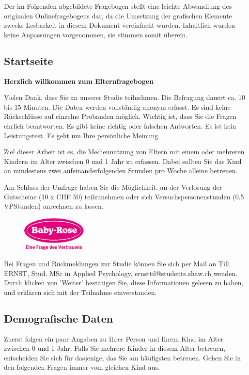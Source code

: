 Der im Folgenden abgebildete Fragebogen stellt eine leichte Abwandlung des originalen Onlinefragebogens dar, da die Umsetzung der grafischen Elemente zwecks Lesbarkeit in diesem Dokument vereinfacht wurden. Inhaltlich wurden keine Anpassungen vorgenommen, sie stimmen somit überein.

\subsection{Startseite}
\textbf{Herzlich willkommen zum Elternfragebogen}

Vielen Dank, dass Sie an unserer Studie teilnehmen. Die Befragung dauert ca. 10 bis 15 Minuten. Die Daten werden vollständig anonym erfasst. Es sind keine Rückschlüsse auf einzelne Probanden möglich. Wichtig ist, dass Sie die Fragen ehrlich beantworten. Es gibt keine richtig oder falschen Antworten. Es ist kein Leistungstest. Es geht um Ihre persönliche Meinung.

Ziel dieser Arbeit ist es, die Mediennutzung von Eltern mit einem oder mehreren Kindern im Alter zwischen 0 und 1 Jahr zu erfassen. Dabei sollten Sie das Kind an mindestens zwei aufeinanderfolgenden Stunden pro Woche alleine betreuen.

Am Schluss der Umfrage haben Sie die Möglichkeit, an der Verlosung der Gutscheine (10 x CHF 50) teilzunehmen oder sich Versuchspersonenstunden (0.5 VPStunden) anrechnen zu lassen.

\begin{figure}[hbtp]
  \centering
     \includegraphics[width=0.3\textwidth]{content/Grafik/babyRose_Logo.jpg}
  \label{fig:babyRose_Logo}
\end{figure}

Bei Fragen und Rückmeldungen zur Studie können Sie sich per Mail an Till ERNST, Stud. MSc in Applied Psychology, ernsttil@students.zhaw.ch wenden. Durch klicken von 'Weiter' bestätigen Sie, diese Informationen gelesen zu haben, und erklären sich mit der Teilnahme einverstanden.

\subsection{Demografische Daten}
Zuerst folgen ein paar Angaben zu Ihrer Person und Ihrem Kind im Alter zwischen 0 und 1 Jahr. Falls Sie mehrere Kinder in diesem Alter betreuen, entscheiden Sie sich für dasjenige, das Sie am häufigsten betreuen. Gehen Sie in den folgenden Fragen immer vom gleichen Kind aus.

